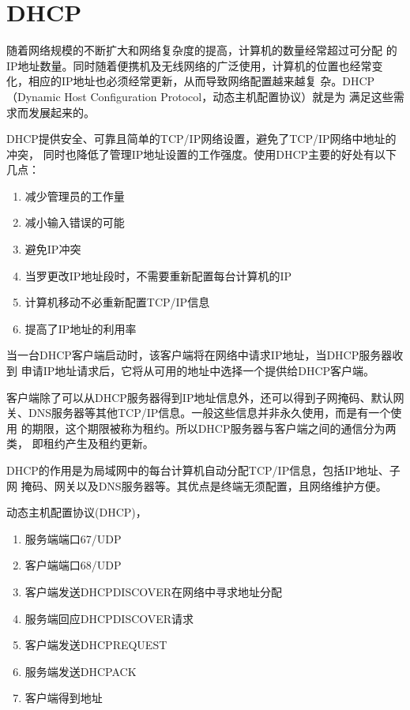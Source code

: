 \chapter{DHCP}

随着网络规模的不断扩大和网络复杂度的提高，计算机的数量经常超过可分配
的IP地址数量。同时随着便携机及无线网络的广泛使用，计算机的位置也经常变
化，相应的IP地址也必须经常更新，从而导致网络配置越来越复
杂。DHCP（Dynamic Host Configuration Protocol，动态主机配置协议）就是为
满足这些需求而发展起来的。

DHCP提供安全、可靠且简单的TCP/IP网络设置，避免了TCP/IP网络中地址的冲突，
同时也降低了管理IP地址设置的工作强度。使用DHCP主要的好处有以下几点：

\begin{enumerate}[itemsep=0pt,parsep=0pt]
\item 减少管理员的工作量
\item 减小输入错误的可能
\item 避免IP冲突
\item 当罗更改IP地址段时，不需要重新配置每台计算机的IP
\item 计算机移动不必重新配置TCP/IP信息
\item 提高了IP地址的利用率
\end{enumerate}

当一台DHCP客户端启动时，该客户端将在网络中请求IP地址，当DHCP服务器收到
申请IP地址请求后，它将从可用的地址中选择一个提供给DHCP客户端。

客户端除了可以从DHCP服务器得到IP地址信息外，还可以得到子网掩码、默认网
关、DNS服务器等其他TCP/IP信息。一般这些信息并非永久使用，而是有一个使用
的期限，这个期限被称为租约。所以DHCP服务器与客户端之间的通信分为两类，
即租约产生及租约更新。

DHCP的作用是为局域网中的每台计算机自动分配TCP/IP信息，包括IP地址、子网
掩码、网关以及DNS服务器等。其优点是终端无须配置，且网络维护方便。

动态主机配置协议(DHCP)，

\begin{enumerate}[itemsep=0pt,parsep=0pt]
\item 服务端端口67/UDP
\item 客户端端口68/UDP
\item 客户端发送DHCPDISCOVER在网络中寻求地址分配
\item 服务端回应DHCPDISCOVER请求
\item 客户端发送DHCPREQUEST
\item 服务端发送DHCPACK
\item 客户端得到地址
\end{enumerate}


